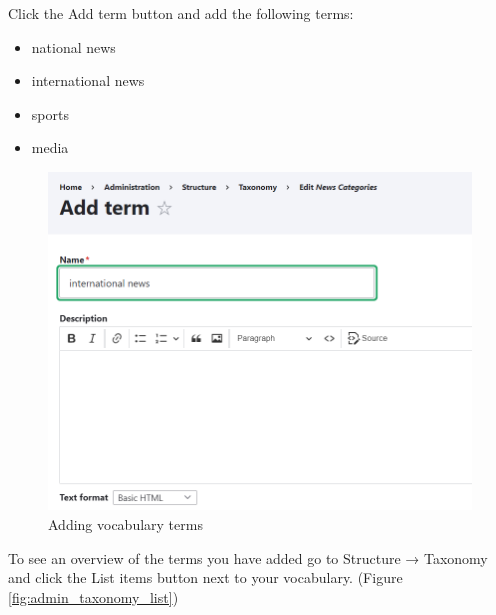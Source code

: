 Click the Add term button and add the following terms:
\begin{itemize}
    \item national news
    \item international news
    \item sports 
    \item media
\end{itemize}

\begin{figure}[H]
    \centering
    \includegraphics[width=1\linewidth]{img/ch4/admin_taxonomy_add}
    \caption{Adding vocabulary terms }
    \label{fig:admin_taxonomy_add}
\end{figure}

To see an overview of the terms you have added go to Structure → Taxonomy and click the List items button next to your vocabulary. (Figure \ref{fig:admin_taxonomy_list})


